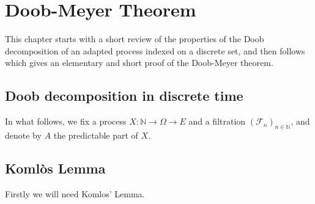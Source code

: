 \chapter{Doob-Meyer Theorem}
\label{chap:doob_meyer}


This chapter starts with a short review of the properties of the Doob decomposition of an adapted process indexed on a discrete set, and then follows \cite{Beiglböck_Schachermayer_Veliyev_2012} which gives an elementary and short proof of the Doob-Meyer theorem.


\section{Doob decomposition in discrete time}



In what follows, we fix a process $X : \mathbb{N} \to \Omega \to E$ and a filtration $(\mathcal{F}_n)_{n \in \mathbb{N}}$, and denote by $A$ the predictable part of $X$.


























\section{Komlòs Lemma}


Firstly we will need Komlos' Lemma.





